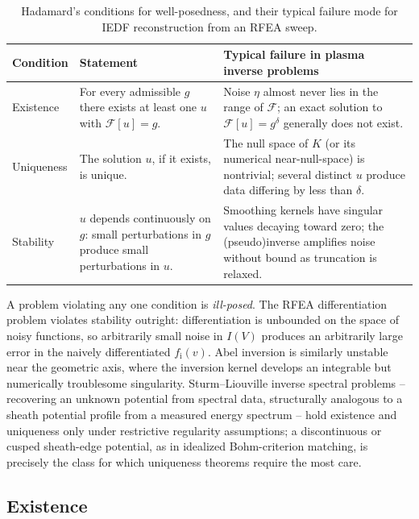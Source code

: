 \begin{table}[htbp]
\centering
\caption{Hadamard's conditions for well-posedness, and their typical failure mode for IEDF reconstruction from an RFEA sweep.}
\label{tab:hadamard}
\begin{tabularx}{\textwidth}{@{}l >{\raggedright\arraybackslash}X >{\raggedright\arraybackslash}X@{}}
\toprule
Condition & Statement & Typical failure in plasma inverse problems \\
\midrule
Existence & For every admissible $g$ there exists at least one $u$ with $\mathcal{F}[u] = g$. & Noise $\eta$ almost never lies in the range of $\mathcal{F}$; an exact solution to $\mathcal{F}[u]=g^{\delta}$ generally does not exist. \\
Uniqueness & The solution $u$, if it exists, is unique. & The null space of $K$ (or its numerical near-null-space) is nontrivial; several distinct $u$ produce data differing by less than $\delta$. \\
Stability & $u$ depends continuously on $g$: small perturbations in $g$ produce small perturbations in $u$. & Smoothing kernels have singular values decaying toward zero; the (pseudo)inverse amplifies noise without bound as truncation is relaxed. \\
\bottomrule
\end{tabularx}
\end{table}

A problem violating any one condition is \emph{ill-posed}. The RFEA differentiation problem violates stability outright: differentiation is unbounded on the space of noisy functions, so arbitrarily small noise in $I(V)$ produces an arbitrarily large error in the naively differentiated $f_{\mathrm{i}}(v)$. Abel inversion is similarly unstable near the geometric axis, where the inversion kernel develops an integrable but numerically troublesome singularity. Sturm--Liouville inverse spectral problems -- recovering an unknown potential from spectral data, structurally analogous to a sheath potential profile from a measured energy spectrum -- hold existence and uniqueness only under restrictive regularity assumptions; a discontinuous or cusped sheath-edge potential, as in idealized Bohm-criterion matching, is precisely the class for which uniqueness theorems require the most care.

\subsection{Existence}

